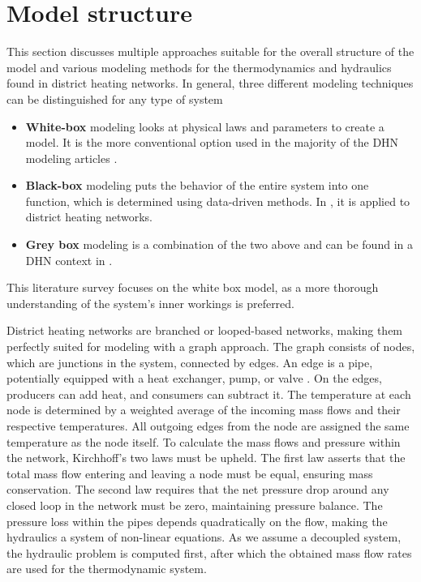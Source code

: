 \section{Model structure}
This section discusses multiple approaches suitable for the overall structure of the model and various modeling methods for the thermodynamics and hydraulics found in district heating networks. In general, three different modeling techniques can be distinguished for any type of system

\begin{itemize}
    \item \textbf{White-box} modeling looks at physical laws and parameters to create a model. It is the more conventional option used in the majority of the DHN modeling articles \cite{sibeijn2025economic,PipePDE}.
    \item \textbf{Black-box} modeling puts the behavior of the entire system into one function, which is determined using data-driven methods. In \cite{GUELPA2016586}\cite{KECEBAS2012339}, it is applied to district heating networks.
    \item \textbf{Grey box} modeling is a combination of the two above and can be found in a DHN context in \cite{grey1}\cite{grey2}. 
\end{itemize}
This literature survey focuses on the white box model, as a more thorough understanding of the system's inner workings is preferred. 

District heating networks are branched or looped-based networks, making them perfectly suited for modeling with a graph approach. The graph consists of nodes, which are junctions in the system, connected by edges. An edge is a pipe, potentially equipped with a heat exchanger, pump, or valve \cite{sibeijn2025economic}. On the edges, producers can add heat, and consumers can subtract it. The temperature at each node is determined by a weighted average of the incoming mass flows and their respective temperatures. All outgoing edges from the node are assigned the same temperature as the node itself. To calculate the mass flows and pressure within the network, Kirchhoff's two laws must be upheld. The first law asserts that the total mass flow entering and leaving a node must be equal, ensuring mass conservation. The second law requires that the net pressure drop around any closed loop in the network must be zero, maintaining pressure balance. The pressure loss within the pipes depends quadratically on the flow, making the hydraulics a system of non-linear equations. As we assume a decoupled system, the hydraulic problem is computed first, after which the obtained mass flow rates are used for the thermodynamic system. 

